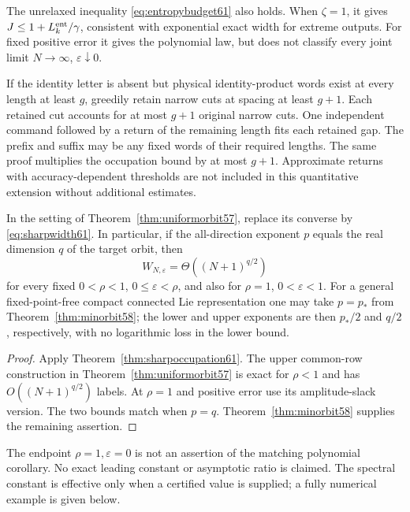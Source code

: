 \begin{remark}\label{rem:endbudget61}
The unrelaxed inequality \eqref{eq:entropybudget61} also holds.
When $\zeta=1$, it gives $J\le1+L_k^{\rm ent}/\gamma$, consistent
with exponential exact width for extreme outputs. For fixed positive
error it gives the polynomial law, but does not classify every joint
limit $N\to\infty$, $\varepsilon\downarrow0$.

If the identity letter is absent but physical identity-product words
exist at every length at least $g$, greedily retain narrow cuts at
spacing at least $g+1$. Each retained cut accounts for at most $g+1$
original narrow cuts. One independent command followed by a return of
the remaining length fits each retained gap. The prefix and suffix
may be any fixed words of their required lengths. The same proof
multiplies the occupation bound by at most $g+1$. Approximate returns
with accuracy-dependent thresholds are not included in this quantitative
extension without additional estimates.
\end{remark}

\begin{corollary}\label{cor:matchedorbits61}
In the setting of Theorem~\ref{thm:uniformorbit57}, replace its converse
by \eqref{eq:sharpwidth61}. In particular, if the all-direction exponent
$p$ equals the real dimension $q$ of the target orbit, then
\[
 W_{N,\varepsilon}=\Theta((N+1)^{q/2})
\]
for every fixed $0<\rho<1$, $0\le\varepsilon<\rho$, and also for
$\rho=1$, $0<\varepsilon<1$. For a general fixed-point-free compact
connected Lie representation one may take $p=p_*$ from
Theorem~\ref{thm:minorbit58}; the lower and upper exponents are then
$p_*/2$ and $q/2$, respectively, with no logarithmic loss in the lower
bound.
\end{corollary}
\begin{proof}
Apply Theorem~\ref{thm:sharpoccupation61}. The upper common-row
construction in Theorem~\ref{thm:uniformorbit57} is exact for
$\rho<1$ and has $O((N+1)^{q/2})$ labels. At $\rho=1$ and positive
error use its amplitude-slack version. The two bounds match when
$p=q$. Theorem~\ref{thm:minorbit58} supplies the remaining assertion.
\end{proof}
The endpoint $\rho=1,\varepsilon=0$ is not an assertion of the matching
polynomial corollary. No exact leading constant or asymptotic ratio is
claimed. The spectral constant is effective only when a certified value
is supplied; a fully numerical example is given below.
